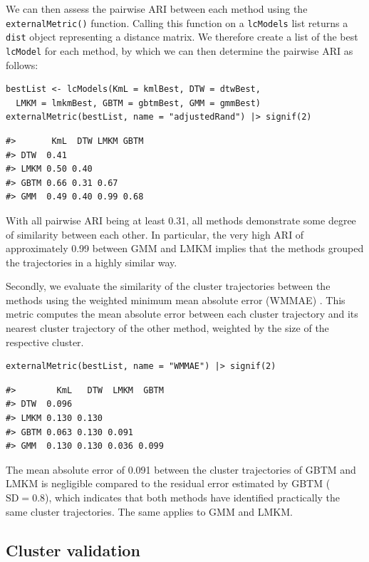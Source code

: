 We can then assess the pairwise ARI between each method using the \texttt{externalMetric()} function. Calling this function on a \texttt{lcModels} list returns a \texttt{dist} object representing a distance matrix. We therefore create a list of the best \texttt{lcModel} for each method, by which we can then determine the pairwise ARI as follows:

\begin{verbatim}
bestList <- lcModels(KmL = kmlBest, DTW = dtwBest,
  LMKM = lmkmBest, GBTM = gbtmBest, GMM = gmmBest)
externalMetric(bestList, name = "adjustedRand") |> signif(2)
\end{verbatim}

\begin{verbatim}
#>       KmL  DTW LMKM GBTM
#> DTW  0.41               
#> LMKM 0.50 0.40          
#> GBTM 0.66 0.31 0.67     
#> GMM  0.49 0.40 0.99 0.68
\end{verbatim}

With all pairwise ARI being at least 0.31, all methods demonstrate some degree of similarity between each other. In particular, the very high ARI of approximately 0.99 between GMM and LMKM implies that the methods grouped the trajectories in a highly similar way.

Secondly, we evaluate the similarity of the cluster trajectories between the methods using the weighted minimum mean absolute error (WMMAE) \citep{denteuling2021comparison}. This metric computes the mean absolute error between each cluster trajectory and its nearest cluster trajectory of the other method, weighted by the size of the respective cluster.

\begin{verbatim}
externalMetric(bestList, name = "WMMAE") |> signif(2)
\end{verbatim}

\begin{verbatim}
#>        KmL   DTW  LMKM  GBTM
#> DTW  0.096                  
#> LMKM 0.130 0.130            
#> GBTM 0.063 0.130 0.091      
#> GMM  0.130 0.130 0.036 0.099
\end{verbatim}

The mean absolute error of 0.091 between the cluster trajectories of GBTM and LMKM is negligible compared to the residual error estimated by GBTM (\(\textrm{SD} = 0.8\)), which indicates that both methods have identified practically the same cluster trajectories. The same applies to GMM and LMKM.

\subsection{Cluster validation}\label{cluster-validation}

